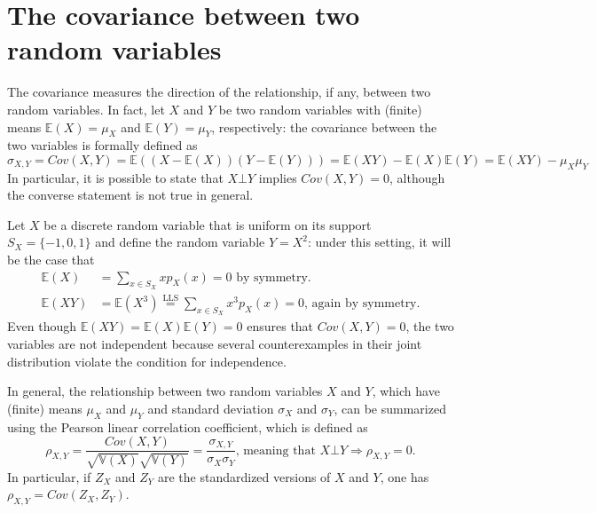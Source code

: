 \documentclass{report}
\begin{document}
\section{The covariance between two random variables}
The covariance measures the direction of the relationship, if any, between two random variables. \newline
In fact, let $\displaystyle X$ and $\displaystyle Y$ be two random variables with (finite) means $\displaystyle \mathbb{E}(X) = \mu_X$ and $\displaystyle \mathbb{E}(Y) = \mu_Y$, respectively: the covariance between the two variables is formally defined as
\[\sigma_{X, Y} = Cov(X, Y) = \mathbb{E}((X - \mathbb{E}(X))(Y - \mathbb{E}(Y))) = \mathbb{E}(XY) - \mathbb{E}(X)\mathbb{E}(Y) = \mathbb{E}(XY) - \mu_X\mu_Y\]
In particular, it is possible to state that $\displaystyle X \bot Y$ implies $\displaystyle Cov(X, Y) = 0$, although the converse statement is not true in general.
\begin{examplebox}
    Let $\displaystyle X$ be a discrete random variable that is uniform on its support $\displaystyle S_X = \{-1, 0, 1\}$ and define the random variable $\displaystyle Y = X^2$: under this setting, it will be the case that
    \begin{align*}
        \mathbb{E}(X) &= \sum_{x \in S_X} xp_X(x) = 0 \text{ by symmetry.} \\
        \mathbb{E}(XY) &= \mathbb{E}(X^3) \stackrel{\text{LLS}}{=} \sum_{x \in S_X} x^3p_X(x) = 0 \text{, again by symmetry.}
    \end{align*}
    Even though $\displaystyle \mathbb{E}(XY) = \mathbb{E}(X)\mathbb{E}(Y) = 0$ ensures that $\displaystyle Cov(X, Y) = 0$, the two variables are not independent because several counterexamples in their joint distribution violate the condition for independence.
\end{examplebox}
\noindent In general, the relationship between two random variables $\displaystyle X$ and $\displaystyle Y$, which have (finite) means $\displaystyle \mu_X$ and $\displaystyle \mu_Y$ and standard deviation $\displaystyle \sigma_X$ and $\displaystyle \sigma_Y$, can be summarized using the Pearson linear correlation coefficient, which is defined as
\[\rho_{X, Y} = \frac{Cov(X, Y)}{\sqrt{\mathbb{V}(X)}\sqrt{\mathbb{V}(Y)}} = \frac{\sigma_{X, Y}}{\sigma_X\sigma_Y} \text{, meaning that $X \bot Y \Rightarrow \rho_{X, Y} = 0$.}\]
In particular, if $\displaystyle Z_X$ and $\displaystyle Z_Y$ are the standardized versions of $\displaystyle X$ and $\displaystyle Y$, one has $\displaystyle \rho_{X, Y} = Cov(Z_X, Z_Y)$. \newline
\end{document}

